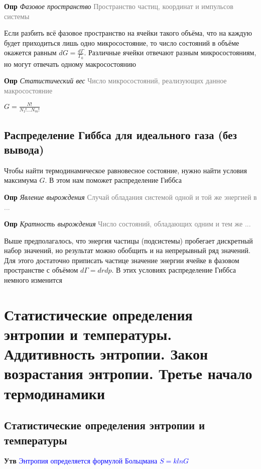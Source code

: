 \documentclass[a4paper, 14pt]{article}
\begin{document}
    \textbf{Опр} \textit{Фазовое пространство} \textcolor{gray}{Пространство частиц, координат и импульсов системы}
    
    Если разбить всё фазовое пространство на ячейки такого объёма, что на каждую будет приходиться лишь одно
    микросостояние, то число состояний в объёме окажется равным $dG = \frac{d\Gamma}{\Gamma_0}$.
    Различные ячейки отвечают разным микросостояниям, но могут отвечать одному макросостоянию
    
    \textbf{Опр} \textit{Статистический вес} \textcolor{gray}{Число микросостояний, реализующих данное макросостояние}
    
    $G = \frac{N!}{N_1! \dots N_m!}$
    
    \subsection{Распределение Гиббса для идеального газа (без вывода)}
    
    Чтобы найти термодинамическое равновесное состояние, нужно найти условия максимума $G$.
    В этом нам поможет распределение Гиббса
    
    \textbf{Опр} \textit{Явление вырождения} \textcolor{gray}{Случай обладания системой одной и той же энергией в ...}
    
    \textbf{Опр} \textit{Кратность вырождения} \textcolor{gray}{Число состояний, обладающих одним и тем же ...}
    
    Выше предполагалось, что энергия частицы (подсистемы) пробегает дискретный набор значений, но результат можно
    обобщить и на непрерывный ряд значений.
    Для этого достаточно приписать частице значение энергии ячейке в фазовом пространстве с объёмом $d\Gamma = dr dp$.
    В этих условиях распределение Гиббса немного изменится
    
    \section{Статистические определения энтропии и температуры.
    Аддитивность энтропии.
    Закон возрастания энтропии.
    Третье начало термодинамики}
    
    \subsection{Статистические определения энтропии и температуры}
    
    \textbf{Утв} \textcolor{blue}{Энтропия определяется формулой Больцмана $S = klnG$}
    
\end{document}
